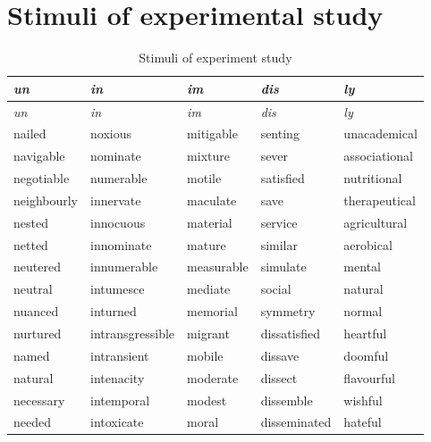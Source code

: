 \chapter{Stimuli of experimental study} \label{Appendix E: Stimuli of Experimental Study}
{\footnotesize\begin{longtabu} to \textwidth {XXXXX}
\caption{Stimuli of experiment study\label{Stimuli of Experiment Study}}\\
\lsptoprule \textit{un}    & \textit{in}      & \textit{im}     & \textit{dis}   & \textit{ly}     \\\midrule\endfirsthead
\midrule \textit{un}    & \textit{in}      & \textit{im}     & \textit{dis}   & \textit{ly}     \\\midrule\endhead
\endfoot\lspbottomrule\endlastfoot
	nailed        & noxious          & mitigable       & senting        & unacademical    \\
	navigable     & nominate         & mixture         & sever          & associational   \\
	negotiable    & numerable        & motile          & satisfied      & nutritional     \\
	neighbourly   & innervate        & maculate        & save           & therapeutical   \\
	nested        & innocuous        & material        & service        & agricultural    \\
					netted        & innominate       & mature          & similar        & aerobical       \\
					neutered      & innumerable      & measurable      & simulate       & mental          \\
	neutral       & intumesce        & mediate         & social         & natural         \\
	nuanced       & inturned         & memorial        & symmetry       & normal          \\		
				nurtured      & intransgressible & migrant         & dissatisfied   & heartful        \\
				named         & intransient      & mobile          & dissave        & doomful         \\
				natural       & intenacity       & moderate        & dissect        & flavourful      \\
				necessary     & intemporal       & modest          & dissemble      & wishful         \\
				needed        & intoxicate       & moral           & disseminated   & hateful         \\

\end{longtabu}}
